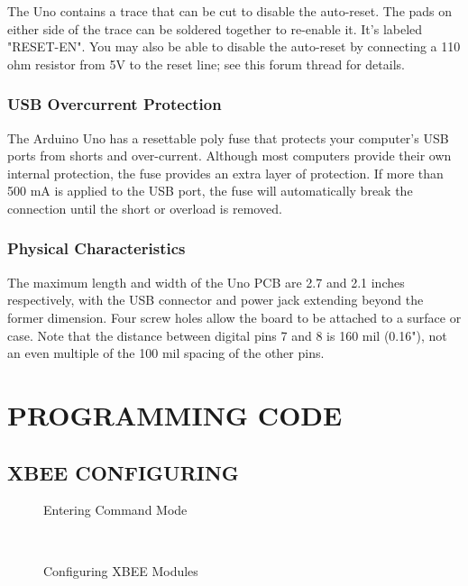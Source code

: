 \documentclass[a4paper, 12pt, notitlepage]{report}
\begin{document}
The Uno contains a trace that can be cut to disable the auto-reset. The pads on either side of the trace can be soldered together to re-enable it. It's labeled "RESET-EN". You may also be able to disable the auto-reset by connecting a 110 ohm resistor from 5V to the reset line; see this forum thread for details.\\

\subsection{USB Overcurrent Protection}

The Arduino Uno has a resettable poly fuse that protects your computer's USB ports from shorts and over-current. Although most computers provide their own internal protection, the fuse provides an extra layer of protection. If more than 500 mA is applied to the USB port, the fuse will automatically break the connection until the short or overload is removed.

\subsection{Physical Characteristics}

The maximum length and width of the Uno PCB are 2.7 and 2.1 inches respectively, with the USB connector and power jack extending beyond the former dimension. Four screw holes allow the board to be attached to a surface or case. Note that the distance between digital pins 7 and 8 is 160 mil (0.16"), not an even multiple of the 100 mil spacing of the other pins.

\chapter{PROGRAMMING CODE}
\section{XBEE CONFIGURING}

\begin{figure}[h!]
{\par}
\caption{Entering Command Mode}
\end{figure}

\begin{figure}
\centering
\mbox{\quad
{}}
\caption{Configuring XBEE Modules} \label{fig12}
\end{figure}
\end{document}
